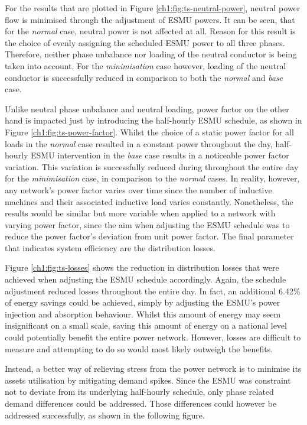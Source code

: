 For the results that are plotted in Figure \ref{ch1:fig:ts-neutral-power}, neutral power flow is minimised through the adjustment of ESMU powers.
It can be seen, that for the \textit{normal} case, neutral power is not affected at all.
Reason for this result is the choice of evenly assigning the scheduled ESMU power to all three phases.
Therefore, neither phase unbalance nor loading of the neutral conductor is being taken into account.
For the \textit{minimisation} case however, loading of the neutral conductor is successfully reduced in comparison to both the \textit{normal} and \textit{base} case.



Unlike neutral phase unbalance and neutral loading, power factor on the other hand is impacted just by introducing the half-hourly ESMU schedule, as shown in Figure \ref{ch1:fig:ts-power-factor}.
Whilst the choice of a static power factor for all loads in the \textit{normal} case resulted in a constant power throughout the day, half-hourly ESMU intervention in the \textit{base} case results in a noticeable power factor variation.
This variation is successfully reduced during throughout the entire day for the \textit{minimisation} case, in comparison to the \textit{normal} cases.
In reality, however, any network's power factor varies over time since the number of inductive machines and their associated inductive load varies constantly.
Nonetheless, the results would be similar but more variable when applied to a network with varying power factor, since the aim when adjusting the ESMU schedule was to reduce the power factor's deviation from unit power factor.
The final parameter that indicates system efficiency are the distribution losses.



Figure \ref{ch1:fig:ts-losses} shows the reduction in distribution losses that were achieved when adjusting the ESMU schedule accordingly.
Again, the schedule adjustment reduced losses throughout the entire day.
In fact, an additional 6.42\% of energy savings could be achieved, simply by adjusting the ESMU's power injection and absorption behaviour.
Whilst this amount of energy may seem insignificant on a small scale, saving this amount of energy on a national level could potentially benefit the entire power network.
However, losses are difficult to measure and attempting to do so would most likely outweigh the benefits.

Instead, a better way of relieving stress from the power network is to minimise its assets utilisation by mitigating demand spikes.
Since the ESMU was constraint not to deviate from its underlying half-hourly schedule, only phase related demand differences could be addressed.
Those differences could however be addressed successfully, as shown in the following figure.

